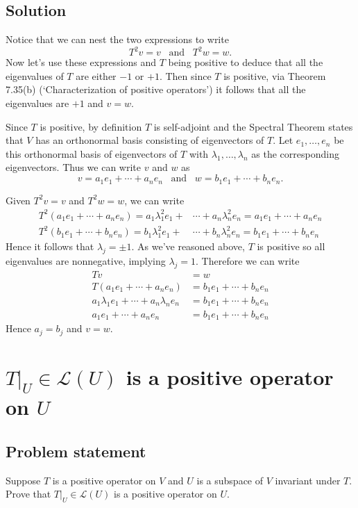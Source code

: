 \documentclass{article}
\begin{document}
\subsection*{Solution}
Notice that we can nest the two expressions to write
\[T^2v=v\;\;\;\text{and}\;\;\;T^2w=w.\]
Now let's use these expressions and $T$ being positive to deduce that all the eigenvalues of $T$ are either $-1$ or $+1$. Then since $T$ is positive, via Theorem 7.35(b) (`Characterization of positive operators') it follows that all the eigenvalues are $+1$ and $v=w$.

Since $T$ is positive, by definition $T$ is self-adjoint and the Spectral Theorem states that $V$ has an orthonormal basis consisting of eigenvectors of $T$. Let $e_1,\ldots,e_n$ be this orthonormal basis of eigenvectors of $T$ with $\lambda_1,\ldots,\lambda_n$ as the corresponding eigenvectors. Thus we can write $v$ and $w$ as
\[v=a_1e_1+\cdots+a_ne_n\;\;\;\text{and}\;\;\;w=b_1e_1+\cdots+b_ne_n.\]

Given $T^2v=v$ and $T^2w=w$, we can write
\begin{align*}
    T^2(a_1e_1+\cdots+a_ne_n)=a_1\lambda_1^2e_1+&\cdots+a_n\lambda_n^2e_n=a_1e_1+\cdots+a_ne_n\\
    T^2(b_1e_1+\cdots+b_ne_n)=b_1\lambda_1^2e_1+&\cdots+b_n\lambda_n^2e_n=b_1e_1+\cdots+b_ne_n
\end{align*}
Hence it follows that $\lambda_j=\pm 1$. As we've reasoned above, $T$ is positive so all eigenvalues are nonnegative, implying $\lambda_j=1$. Therefore we can write
\begin{align*}
    Tv&=w \\
    T(a_1e_1+\cdots+a_ne_n)&=b_1e_1+\cdots+b_ne_n \\
    a_1\lambda_1e_1+\cdots+a_n\lambda_ne_n&=b_1e_1+\cdots+b_ne_n \\
    a_1e_1+\cdots+a_ne_n&=b_1e_1+\cdots+b_ne_n
\end{align*}
Hence $a_j=b_j$ and $v=w$.

\clearpage

\section{$T|_U\in\mathcal{L}(U)$ is a positive operator on $U$}
\subsection*{Problem statement}
Suppose $T$ is a positive operator on $V$ and $U$ is a subspace of $V$ invariant under $T$. Prove that $T|_U\in\mathcal{L}(U)$ is a positive operator on $U$.
\end{document}
